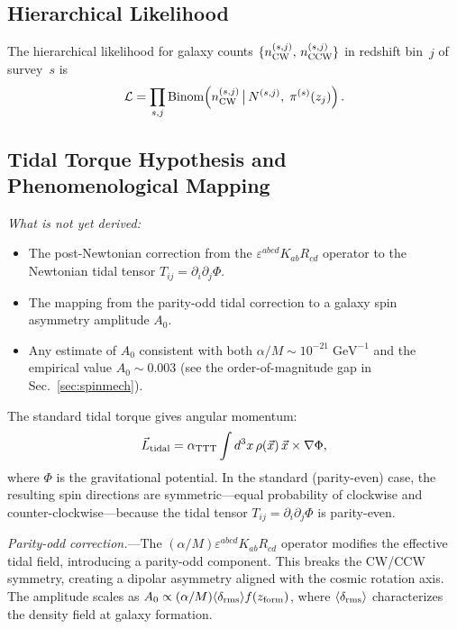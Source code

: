 \documentclass[aps,prd,twocolumn,superscriptaddress,showpacs,preprintnumbers,nofootinbib,longbibliography,floatfix]{revtex4-2}
\begin{document}
\subsection{Hierarchical Likelihood}

The hierarchical likelihood for galaxy counts $\{n_{\rm CW}^{(s,j)},\,n_{\rm CCW}^{(s,j)}\}$ in redshift bin~$j$ of survey~$s$ is
\begin{equation}
\mathcal{L}=\prod_{s,j}\text{Binom}\!\left(n_{\rm CW}^{(s,j)}\,\big|\,N^{(s,j)},\;\pi^{(s)}(z_j)\right).
\end{equation}

\subsection{Tidal Torque Hypothesis and Phenomenological Mapping}

\textit{What is not yet derived:}
\begin{itemize}[leftmargin=*]
\item The post-Newtonian correction from the $\varepsilon^{abcd}K_{ab}R_{cd}$ operator to the Newtonian tidal tensor $T_{ij} = \partial_i\partial_j\Phi$.
\item The mapping from the parity-odd tidal correction to a galaxy spin asymmetry amplitude $A_0$.
\item Any estimate of $A_0$ consistent with both $\alpha/M \sim 10^{-21}\;\text{GeV}^{-1}$ and the empirical value $A_0 \sim 0.003$ (see the order-of-magnitude gap in Sec.~\ref{sec:spinmech}).
\end{itemize}

\noindent The standard tidal torque gives angular momentum:
\begin{equation}
\vec{L}_{\rm tidal} = \alpha_{\rm TTT} \int d^3x\, \rho(\vec{x})\, \vec{x} \times \nabla\Phi,
\end{equation}
where $\Phi$ is the gravitational potential. In the standard (parity-even) case, the resulting spin directions are symmetric---equal probability of clockwise and counter-clockwise---because the tidal tensor $T_{ij} = \partial_i\partial_j\Phi$ is parity-even.

\textit{Parity-odd correction.}---The $(\alpha/M)\varepsilon^{abcd}K_{ab}R_{cd}$ operator modifies the effective tidal field, introducing a parity-odd component. This breaks the CW/CCW symmetry, creating a dipolar asymmetry aligned with the cosmic rotation axis. The amplitude scales as $A_0 \propto (\alpha/M)\langle\delta_{\rm rms}\rangle f(z_{\rm form})$, where $\langle\delta_{\rm rms}\rangle$ characterizes the density field at galaxy formation.
\end{document}
